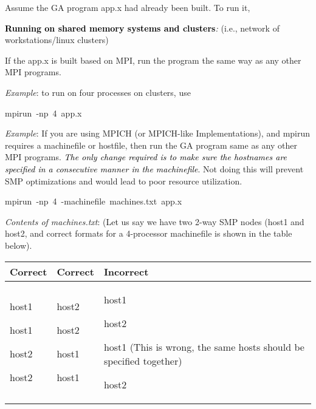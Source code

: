 Assume the GA program app.x had already been built. To run it,

\textbf{\textcolor{black}{Running on shared memory systems and clusters}}\emph{:
}(i.e., network of workstations/linux clusters)

If the app.x is built based on MPI, run the program the same way as
any other MPI programs. 

\emph{Example}: to run on four processes on clusters, use 
\begin{lyxcode}
mpirun~-np~4~app.x
\end{lyxcode}
\emph{Example}: If you are using MPICH (or MPICH-like Implementations),
and mpirun requires a machinefile or hostfile, then run the GA program
same as any other MPI programs. \textit{\textcolor{black}{The only
change required is to make sure the hostnames are specified in a consecutive
manner in the machinefile}}. Not doing this will prevent SMP optimizations
and would lead to poor resource utilization.
\begin{lyxcode}
mpirun~-np~4~-machinefile~machines.txt~app.x
\end{lyxcode}
\emph{Contents of machines.txt}: (Let us say we have two 2-way SMP
nodes (host1 and host2, and correct formats for a 4-processor machinefile
is shown in the table below).

\begin{tabular}{|>{\centering}p{2cm}|>{\centering}p{2cm}|>{\raggedright}p{3cm}|}
\hline 
Correct & Correct & Incorrect\tabularnewline
\hline
\hline 
host1

host1

host2

host2 & host2

host2

host1

host1 & host1

host2

host1 (This is wrong, the same hosts should be specified together)

host2\tabularnewline
\hline
\end{tabular}

